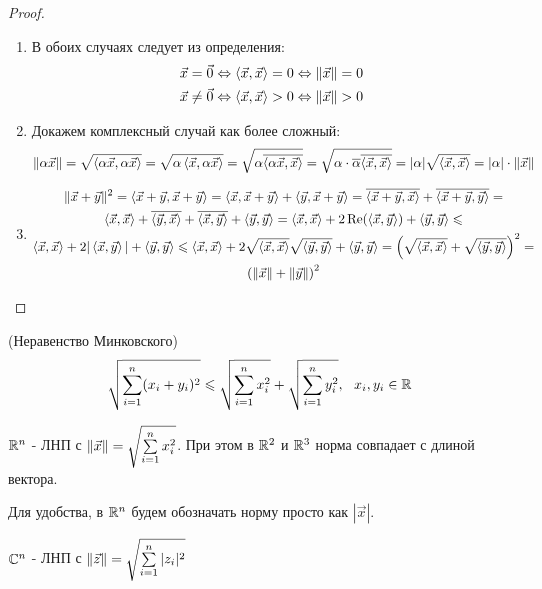 \begin{proof}~
	\begin{enumerate}
		\item В обоих случаях следует из определения:
		\begin{align*}
			\vec{x} = \vec{0} \Leftrightarrow \left\langle\vec{x}, \vec{x}\right\rangle = 0 \Leftrightarrow \|\vec{x}\| = 0
			\\
			\vec{x} \neq \vec{0} \Leftrightarrow \left\langle\vec{x}, \vec{x}\right\rangle > 0 \Leftrightarrow \|\vec{x}\| > 0
		\end{align*}
		
		\item Докажем комплексный случай как более сложный:
		\[
			\|\alpha\vec{x}\| = \sqrt{\left\langle\alpha\vec{x}, \alpha\vec{x}\right\rangle} = \sqrt{\alpha\left\langle\vec{x}, \alpha\vec{x}\right\rangle} = \sqrt{\alpha\overline{\left\langle\alpha\vec{x}, \vec{x}\right\rangle}} = \sqrt{\alpha \cdot \overline{\alpha}\overline{\left\langle\vec{x}, \vec{x}\right\rangle}} = |\alpha|\sqrt{\left\langle\vec{x}, \vec{x}\right\rangle} = |\alpha| \cdot \|\vec{x}\|
		\]
		
		\item
		\begin{multline*}
			\|\vec{x} + \vec{y}\|^2 = \left\langle\vec{x} + \vec{y}, \vec{x} + \vec{y}\right\rangle = \left\langle\vec{x}, \vec{x} + \vec{y}\right\rangle + \left\langle\vec{y}, \vec{x} + \vec{y}\right\rangle = \overline{\left\langle\vec{x} + \vec{y}, \vec{x}\right\rangle} + \overline{\left\langle\vec{x} + \vec{y}, \vec{y}\right\rangle} =
			\\
			\left\langle\vec{x}, \vec{x}\right\rangle + \overline{\left\langle\vec{y}, \vec{x}\right\rangle} + \overline{\left\langle\vec{x}, \vec{y}\right\rangle} + \left\langle\vec{y}, \vec{y}\right\rangle = \left\langle\vec{x}, \vec{x}\right\rangle + 2\operatorname{Re}(\left\langle\vec{x}, \vec{y}\right\rangle) + \left\langle\vec{y}, \vec{y}\right\rangle \leqslant
			\\
			\left\langle\vec{x}, \vec{x}\right\rangle + 2 |\left\langle\vec{x}, \vec{y}\right\rangle| + \left\langle\vec{y}, \vec{y}\right\rangle \leqslant \left\langle\vec{x}, \vec{x}\right\rangle + 2 \sqrt{\left\langle\vec{x}, \vec{x}\right\rangle} \sqrt{\left\langle\vec{y}, \vec{y}\right\rangle} + \left\langle\vec{y}, \vec{y}\right\rangle = \left(\sqrt{\left\langle\vec{x}, \vec{x}\right\rangle} + \sqrt{\left\langle\vec{y}, \vec{y}\right\rangle}\right)^2 =
			\\
			\left(\|\vec{x}\| + \|\vec{y}\|\right)^2
		\end{multline*}
	\end{enumerate}
\end{proof}

\begin{corollary} (Неравенство Минковского)
	\[
		\sqrt{\sum\limits_{i = 1}^n (x_i + y_i)^2} \leqslant \sqrt{\sum\limits_{i = 1}^n x_i^2} + \sqrt{\sum\limits_{i = 1}^n y_i^2},\ \ x_i, y_i \in \mathbb{R} 
	\]
\end{corollary}

\begin{lemma}
	$\mathbb{R}^n$ - ЛНП с $\|\vec{x}\| = \sqrt{\sum\limits_{i = 1}^n x_i^2}$. При этом в $\mathbb{R}^2$ и $\mathbb{R}^3$ норма совпадает с длиной вектора.
\end{lemma}

\begin{note}
	Для удобства, в $\mathbb{R}^n$ будем обозначать норму просто как $|\vec{x}|$.
\end{note}

\begin{lemma}
	$\mathbb{C}^n$ - ЛНП с $\|\vec{z}\| = \sqrt{\sum\limits_{i = 1}^n |z_i|^2}$
\end{lemma}